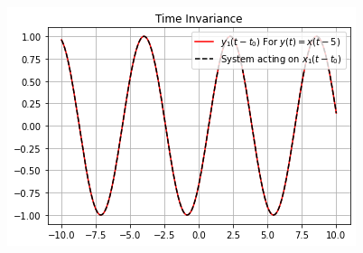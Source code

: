 \documentclass[journal,12pt,twocolumn]{IEEEtran}
\begin{document}
\begin{figure}[h]
\includegraphics[width = \columnwidth]{y4_t}
\end{figure}
\end{document}
